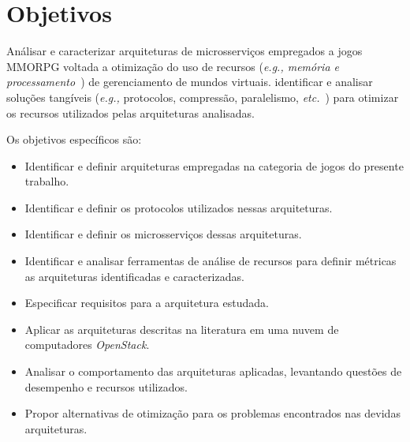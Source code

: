 \section{Objetivos}
\label{obj}

Análisar e caracterizar arquiteturas de microsserviços empregados a jogos \ac{MMORPG} voltada a otimização do uso de recursos (\textit{\textit{e.g.,} memória e processamento}~\cite{1417630}) de gerenciamento de mundos virtuais.
%
identificar e analisar soluções tangíveis (\textit{e.g.,} protocolos, compressão, paralelismo, \textit{etc.}~\cite{1417630}) para otimizar os recursos utilizados pelas arquiteturas analisadas.

Os objetivos específicos são:
\begin{itemize}
    \item Identificar e definir arquiteturas empregadas na categoria de jogos do presente trabalho.
    \item Identificar e definir os protocolos utilizados nessas arquiteturas.
    \item Identificar e definir os microsserviços dessas arquiteturas.
    \item Identificar e analisar ferramentas de análise de recursos para definir métricas as arquiteturas identificadas e caracterizadas.
    \item Especificar requisitos para a arquitetura estudada.
    \item Aplicar as arquiteturas descritas na literatura em uma nuvem de computadores \textit{OpenStack}.
    \item Analisar o comportamento das arquiteturas aplicadas, levantando questões de desempenho e recursos utilizados.
    \item Propor alternativas de otimização para os problemas encontrados nas devidas arquiteturas.
\end{itemize}
